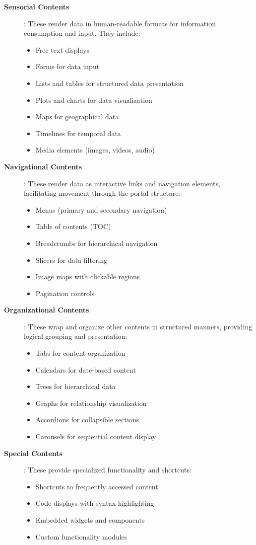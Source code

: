 \begin{description}
\item[\textbf{Sensorial Contents}]: These render data in human-readable formats for information consumption and input. They include:
\begin{itemize}
\item Free text displays
\item Forms for data input
\item Lists and tables for structured data presentation
\item Plots and charts for data visualization
\item Maps for geographical data
\item Timelines for temporal data
\item Media elements (images, videos, audio)
\end{itemize}

\item[\textbf{Navigational Contents}]: These render data as interactive links and navigation elements, facilitating movement through the portal structure:
\begin{itemize}
\item Menus (primary and secondary navigation)
\item Table of contents (TOC)
\item Breadcrumbs for hierarchical navigation
\item Slicers for data filtering
\item Image maps with clickable regions
\item Pagination controls
\end{itemize}

\item[\textbf{Organizational Contents}]: These wrap and organize other contents in structured manners, providing logical grouping and presentation:
\begin{itemize}
\item Tabs for content organization
\item Calendars for date-based content
\item Trees for hierarchical data
\item Graphs for relationship visualization
\item Accordions for collapsible sections
\item Carousels for sequential content display
\end{itemize}

\item[\textbf{Special Contents}]: These provide specialized functionality and shortcuts:
\begin{itemize}
\item Shortcuts to frequently accessed content
\item Code displays with syntax highlighting
\item Embedded widgets and components
\item Custom functionality modules
\end{itemize}
\end{description}

